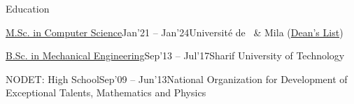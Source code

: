 
\def\offset{-0.1cm}


\begin{xSection}{Education}

    \vspace{0.3cm}


    \begin{kSubsection}{\href{https://papyrus.bib.umontreal.ca/xmlui/handle/1866/32831}{\footnotesize M.Sc. in Computer Science}}{\scriptsize  Jan'21 -- Jan'24}{\footnotesize Université de \mtl ~\& Mila (\underline{Dean's List})}{}
        \vspace{\offset}
    \item[]
    \end{kSubsection}

    \vspace{-2mm}

    \begin{kSubsection}{\href{https://drive.google.com/file/d/12cIxzDXKtyb9yBuGUFMo0O03pQOT9hxT/view}{\footnotesize B.Sc. in Mechanical Engineering}}{\scriptsize  Sep'13 -- Jul'17}{\footnotesize Sharif University of Technology}{}
        \vspace{\offset}
    \item[]
    \end{kSubsection}

    \vspace{-.1cm}

    \begin{kSubsection}{\footnotesize NODET: High School}{\scriptsize  Sep'09 -- Jun'13}{\footnotesize{National Organization for Development of Exceptional Talents, Mathematics and Physics}}{}
        \vspace{\offset}
    \item[]
    \end{kSubsection}
    \vspace{-.1cm}


\end{xSection}

